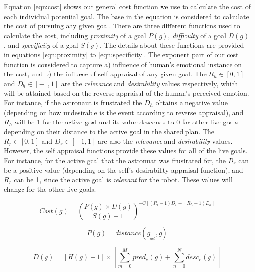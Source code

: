 \documentclass[conference]{IEEEtran}
\begin{document}
Equation \ref{eqn:cost} shows our general cost function we use to calculate the
cost of each individual potential goal. The base in the equation is considered
to calculate the cost of pursuing any given goal. There are three different
functions used to calculate the cost, including \textit{proximity} of a goal
$P(g)$, \textit{difficulty} of a goal $D(g)$, and \textit{specificity} of a
goal $S(g)$. The details about these functions are provided in equations
\ref{eqn:proximity} to \ref{eqn:specificity}. The exponent part of our cost
function is considered to capture a) influence of human's emotional instance on
the cost, and b) the influece of self appraisal of any given goal. The
$R_h\in[0,1]$ and $D_h\in[-1,1]$  are the \textit{relevance} and
\textit{desirability} values respectively, which will be attained based on the
reverse appraisal of the human's perceived emotion. For instance, if the
astronaut is frustrated the $D_h$ obtains a negative value (depending on how
undesirable is the event according to reverse appraisal), and $R_h$ will be 1
for the active goal and its value descends to 0 for other live goals depending
on their distance to the active goal in the shared plan. The $R_r\in[0,1]$ and
$D_r\in[-1,1]$ are also the \textit{relevance} and \textit{desirability} values.
However, the self appraisal functions provide these values for all of the live
goals. For instance, for the active goal that the astronuat was frustrated for,
the $D_r$ can be a positive value (depending on the self's desirability
appraisal function), and $R_r$ can be 1, since the active goal is
\textit{relevant} for the robot. These values will change for the other live
goals.

\vspace*{-3mm}
\begin{equation}
Cost(g) = \left(\frac{P(g)\times D(g)}{S(g)+1}\right)^{-C[(R_r+1)D_r +
(R_h+1)D_h]}
\label{eqn:cost}
\end{equation}

\vspace*{-1mm}
\begin{equation}
P(g) =  distance(g_{_{act}},g)
\label{eqn:proximity}
\end{equation}

\vspace*{-5mm}
\begin{equation}
D(g) = \left[H(g)+1\right]\times\left[\sum\limits_{m=0}^{M} pred_e(g) +
\sum\limits_{n=0}^{N} desc_e(g)\right]
\label{eqn:difficulty}
\end{equation}
\end{document}
